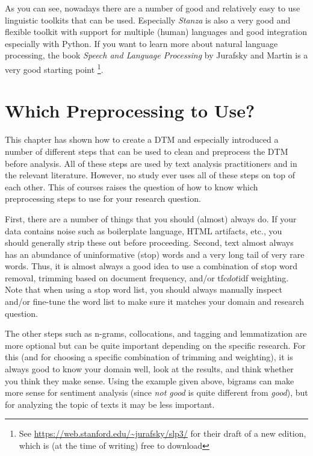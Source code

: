 As you can see, nowadays there are a number of good and relatively easy to use linguistic toolkits that can be used.
Especially \emph{Stanza} \citep{stanza} is also a very good and flexible toolkit with support for multiple (human) languages and good integration especially with Python.
If you want to learn more about natural language processing, the book \emph{Speech and Language Processing} by Jurafsky and Martin is a very good starting point \citep{jurafsky}\footnote{See \url{https://web.stanford.edu/~jurafsky/slp3/} for their draft of a new edition, which is (at the time of writing) free to download}.


\section{Which Preprocessing to Use?}

This chapter has shown how to create a DTM and especially introduced a number of different steps that can be used to clean and preprocess the DTM before analysis.
All of these steps are used by text analysis practitioners and in the relevant literature.
However, no study ever uses all of these steps on top of each other.
This of courses raises the question of how to know which preprocessing steps to use for your research question.

First, there are a number of things that you should (almost) always do.
If your data contains noise such as boilerplate language, HTML artifacts, etc., you should generally strip these out before proceeding.
Second, text almost always has an abundance of uninformative (stop) words and a very long tail of very rare words.
Thus, it is almost always a good idea to use a combination of stop word removal, trimming based on document frequency, and/or tf$cdot$idf weighting.
Note that when using a stop word list, you should always manually inspect and/or fine-tune the word list to make sure it matches your domain and research question.

The other steps such as n-grams, collocations, and tagging and lemmatization are more optional but can be quite important depending on the specific research.
For this (and for choosing a specific combination of trimming and weighting), it is always good to know your domain well, look at the results, and think whether you think they make sense.
Using the example given above, bigrams can make more sense for sentiment analysis (since \emph{not good} is quite different from \emph{good}),
but for analyzing the topic of texts it may be less important.

